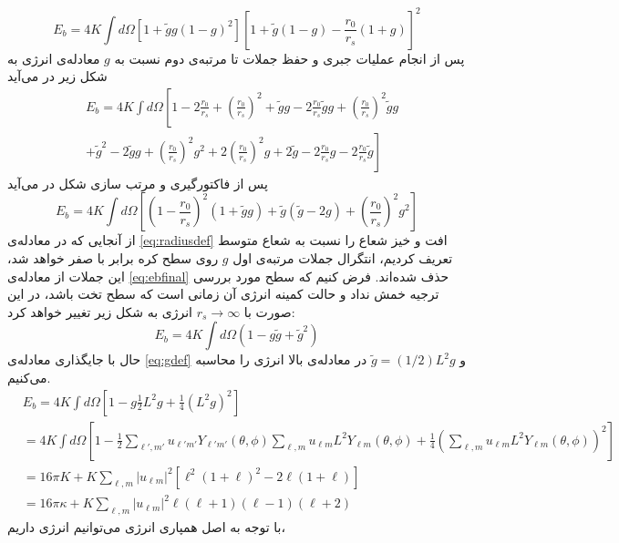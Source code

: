 \begin{equation}
E_b=4K\int d\Omega\left[1+\tilde gg(1-g)^2\right]\left[1+\tilde g(1-g)-\frac{r_0}{r_s}(1+g)\right]^2
\end{equation}
پس از انجام عملیات جبری و حفظ جملات تا مرتبه‌ی دوم نسبت به $g$
معادله‌ی انرژی به شکل زیر در می‌آید
\begin{equation}
\begin{aligned}
&E_b=4K\int d\Omega\left[1-2\frac{r_0}{r_s}+\left(\frac{r_0}{r_s}\right)^2+\tilde gg -2\frac{r_0}{r_s}\tilde gg+\left(\frac{r_0}{r_s}\right)^2\tilde gg\right.\\
&\left.+\tilde g^2-2\tilde gg +\left(\frac{r_0}{r_s}\right)^2g^2+2\left(\frac{r_0}{r_s}\right)^2g+2\tilde g-2\frac{r_0}{r_s}g-2\frac{r_0}{r_s}\tilde g\right]
\end{aligned}
\end{equation}
پس از فاکتورگیری و مرتب سازی شکل در می‌آید
\begin{equation}
E_b=4K\int d\Omega\left[\left(1-\frac{r_0}{r_s}\right)^2(1+\tilde gg)+\tilde g(\tilde g-2g)+\left(\frac{r_0}{r_s}\right)^2g^2\right]
\label{eq:ebfinal}
\end{equation}
از آنجایی که در معادله‌ی
\ref{eq:radiusdef}
افت و خیز شعاع را نسبت به شعاع متوسط تعریف کردیم، انتگرال جملات مرتبه‌ی اول $g$ روی سطح کره برابر با صفر خواهد شد، این جملات از معادله‌ی 
\ref{eq:ebfinal}
حذف شده‌اند. فرض کنیم که سطح مورد بررسی ترجیه خمش نداد و حالت کمینه انرژی آن زمانی است که سطح تخت باشد، در این صورت با $r_s\rightarrow\infty$ انرژی به شکل زیر تغییر خواهد کرد:
\begin{equation}
E_b=4K\int d\Omega\left(1-g\tilde g+\tilde g^2\right)
\label{eq:ebfinalnors}
\end{equation}
حال با جایگذاری معادله‌ی
\ref{eq:gdef}
و $\tilde g=(1/2)L^2g$ در معادله‌ی بالا انرژی را محاسبه می‌کنیم.
\begin{equation}
\begin{aligned}
&E_b=4K\int d\Omega\left[1-g\frac{1}{2}L^2g+\frac{1}{4}\left(L^2g\right)^2\right]\\
&=4K\int d\Omega\left[1-\frac{1}{2}\sum_{\ell',m'}u_{\ell' m'}Y_{\ell' m'} (\theta,\phi)\sum_{\ell,m}u_{\ell m}L^2Y_{\ell m} (\theta,\phi)+\frac{1}{4}\left(\sum_{\ell,m}u_{\ell m}L^2Y_{\ell m} (\theta,\phi)\right)^2\right]\\
&=16\pi K+K\sum_{\ell,m}|u_{\ell m}|^2\left[\ell^2(1+\ell)^2-2\ell(1+\ell)\right]\\
&=16\pi\kappa+K\sum_{\ell,m}|u_{\ell m}|^2\ell(\ell+1)(\ell-1)(\ell+2)
\end{aligned}
\end{equation}
با توجه به اصل همپاری انرژی می‌توانیم انرژی داریم،

